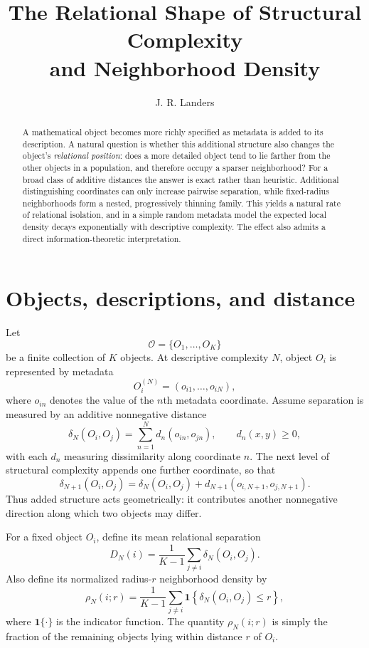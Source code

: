 \documentclass[10pt]{article}
\title{\vspace{-2.3em}\textbf{The Relational Shape of Structural Complexity\\and Neighborhood Density}}
\author{J. R. Landers}
\date{}
\begin{document}
\maketitle
\vspace{-1.35em}
\small

\begin{abstract}
A mathematical object becomes more richly specified as metadata is added to its description. A natural question is whether this additional structure also changes the object's \emph{relational position}: does a more detailed object tend to lie farther from the other objects in a population, and therefore occupy a sparser neighborhood? For a broad class of additive distances the answer is exact rather than heuristic. Additional distinguishing coordinates can only increase pairwise separation, while fixed-radius neighborhoods form a nested, progressively thinning family. This yields a natural rate of relational isolation, and in a simple random metadata model the expected local density decays exponentially with descriptive complexity. The effect also admits a direct information-theoretic interpretation.
\end{abstract}

\section*{Objects, descriptions, and distance}
Let
\[
\mathcal O=\{O_1,\ldots,O_K\}
\]
be a finite collection of $K$ objects. At descriptive complexity $N$, object $O_i$ is represented by metadata
\[
O_i^{(N)}=(o_{i1},\ldots,o_{iN}),
\]
where $o_{in}$ denotes the value of the $n$th metadata coordinate. Assume separation is measured by an additive nonnegative distance
\[
\delta_N(O_i,O_j)=\sum_{n=1}^{N} d_n(o_{in},o_{jn}),
\qquad d_n(x,y)\ge 0,
\]
with each $d_n$ measuring dissimilarity along coordinate $n$. The next level of structural complexity appends one further coordinate, so that
\[
\delta_{N+1}(O_i,O_j)
=\delta_N(O_i,O_j)+d_{N+1}(o_{i,N+1},o_{j,N+1}).
\]
Thus added structure acts geometrically: it contributes another nonnegative direction along which two objects may differ.

For a fixed object $O_i$, define its mean relational separation
\[
D_N(i)=\frac{1}{K-1}\sum_{j\ne i}\delta_N(O_i,O_j).
\]
Also define its normalized radius-$r$ neighborhood density by
\[
\rho_N(i;r)=\frac{1}{K-1}\sum_{j\ne i}
\mathbf 1\!\left\{\delta_N(O_i,O_j)\le r\right\},
\]
where $\mathbf 1\{\cdot\}$ is the indicator function. The quantity $\rho_N(i;r)$ is simply the fraction of the remaining objects lying within distance $r$ of $O_i$.
\end{document}

